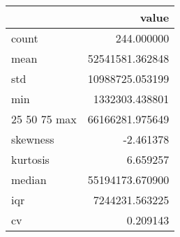 \begin{tabular}{lr}
\toprule
 & value \\
\midrule
count & 244.000000 \\
mean & 52541581.362848 \\
std & 10988725.053199 \\
min & 1332303.438801 \\
25%
50%
75%
max & 66166281.975649 \\
skewness & -2.461378 \\
kurtosis & 6.659257 \\
median & 55194173.670900 \\
iqr & 7244231.563225 \\
cv & 0.209143 \\
\bottomrule
\end{tabular}
